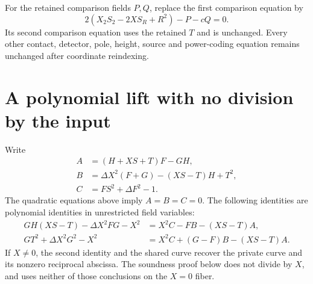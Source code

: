 \documentclass[11pt]{article}
\begin{document}
For the retained comparison fields \(P,Q\), replace the first
comparison equation by
\begin{equation}\label{eq:compare}
       2(X_2S_2-2XS_R+R^2)-P-cQ=0.
\end{equation}
Its second comparison equation uses the retained \(T\) and is
unchanged. Every other contact, detector, pole, height, source and
power-coding equation remains unchanged after coordinate reindexing.

\section{A polynomial lift with no division by the input}

Write
\begin{align*}
 A&=(H+XS+T)F-GH,\\
 B&=\Delta X^2(F+G)-(XS-T)H+T^2,\\
 C&=FS^2+\Delta F^2-1.
\end{align*}
The quadratic equations above imply \(A=B=C=0\). The following
identities are polynomial identities in unrestricted field variables:
\begin{align}
 GH(XS-T)-\Delta X^2FG-X^2
   &=X^2C-FB-(XS-T)A, \label{eq:scaleid}\\
 GT^2+\Delta X^2G^2-X^2
   &=X^2C+(G-F)B-(XS-T)A. \label{eq:curveid}
\end{align}
If \(X\ne0\), the second identity and the shared curve recover the
private curve and its nonzero reciprocal abscissa. The soundness proof
below does not divide by \(X\), and uses neither of those conclusions
on the \(X=0\) fiber.
\end{document}
